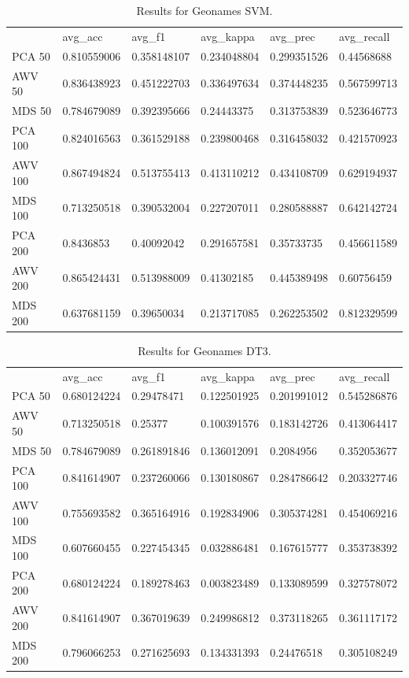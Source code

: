 \begin{table}[]
	\begin{tabular}{llllll}
		& avg\_acc    & avg\_f1     & avg\_kappa  & avg\_prec   & avg\_recall \\
		PCA 50  & 0.810559006 & 0.358148107 & 0.234048804 & 0.299351526 & 0.44568688  \\
		AWV 50  & 0.836438923 & 0.451222703 & 0.336497634 & 0.374448235 & 0.567599713 \\
		MDS 50  & 0.784679089 & 0.392395666 & 0.24443375  & 0.313753839 & 0.523646773 \\
		PCA 100 & 0.824016563 & 0.361529188 & 0.239800468 & 0.316458032 & 0.421570923 \\
		AWV 100 & 0.867494824 & 0.513755413 & 0.413110212 & 0.434108709 & 0.629194937 \\
		MDS 100 & 0.713250518 & 0.390532004 & 0.227207011 & 0.280588887 & 0.642142724 \\
		PCA 200 & 0.8436853   & 0.40092042  & 0.291657581 & 0.35733735  & 0.456611589 \\
		AWV 200 & 0.865424431 & 0.513988009 & 0.41302185  & 0.445389498 & 0.60756459  \\
		MDS 200 & 0.637681159 & 0.39650034  & 0.213717085 & 0.262253502 & 0.812329599
	\end{tabular}
	\caption{Results for Geonames SVM.}
	\label{table:Newsgroups}
\end{table}

\begin{table}[]
\begin{tabular}{llllll}
	& avg\_acc    & avg\_f1     & avg\_kappa  & avg\_prec   & avg\_recall \\
	PCA 50  & 0.680124224 & 0.29478471  & 0.122501925 & 0.201991012 & 0.545286876 \\
	AWV 50  & 0.713250518 & 0.25377     & 0.100391576 & 0.183142726 & 0.413064417 \\
	MDS 50  & 0.784679089 & 0.261891846 & 0.136012091 & 0.2084956   & 0.352053677 \\
	PCA 100 & 0.841614907 & 0.237260066 & 0.130180867 & 0.284786642 & 0.203327746 \\
	AWV 100 & 0.755693582 & 0.365164916 & 0.192834906 & 0.305374281 & 0.454069216 \\
	MDS 100 & 0.607660455 & 0.227454345 & 0.032886481 & 0.167615777 & 0.353738392 \\
	PCA 200 & 0.680124224 & 0.189278463 & 0.003823489 & 0.133089599 & 0.327578072 \\
	AWV 200 & 0.841614907 & 0.367019639 & 0.249986812 & 0.373118265 & 0.361117172 \\
	MDS 200 & 0.796066253 & 0.271625693 & 0.134331393 & 0.24476518  & 0.305108249
\end{tabular}
\caption{Results for Geonames DT3.}
\label{table:Newsgroups}
\end{table}

